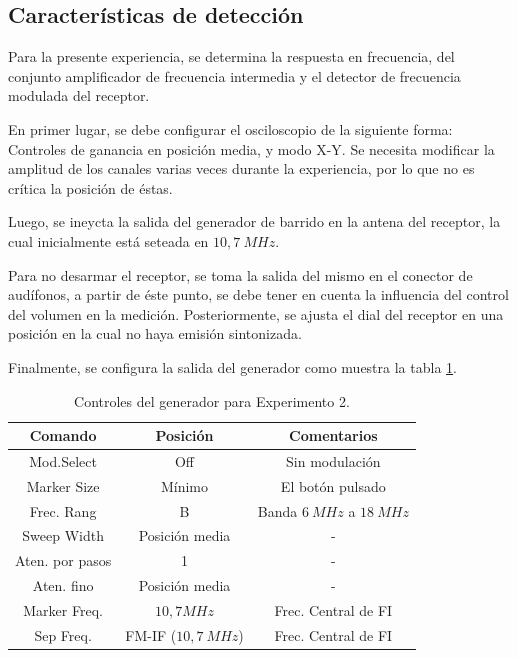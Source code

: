   \subsection{Características de detección}

  Para la presente experiencia, se determina la respuesta en frecuencia, del conjunto 
  amplificador de frecuencia intermedia y el detector de frecuencia modulada del 
  receptor.

  En primer lugar, se debe configurar el osciloscopio de la siguiente forma: 
  Controles de ganancia en posición media, y modo X-Y. Se necesita modificar 
  la amplitud de los canales varias veces durante la experiencia, por lo que 
  no es crítica la posición de éstas.

  Luego, se ineycta la salida del generador de barrido en la 
  antena del receptor, la cual inicialmente está seteada en $10,7~MHz$.

  Para no desarmar el receptor, se toma la salida del mismo en el conector 
  de audífonos, a partir de éste punto, se debe tener en cuenta la influencia 
  del control del volumen en la medición. Posteriormente, se ajusta el dial 
  del receptor en una posición en la cual no haya emisión sintonizada.

  Finalmente, se configura la salida del generador como muestra la tabla 
  \ref{tab:ControlesGenExp2}.

  \begin{table}[H] 
    \centering 
    \begin{tabular}[H]{|c|c|c|}
      \textbf{Comando} & \textbf{Posición} & \textbf{Comentarios} \\  \hline  
          Mod.Select    &       Off         &     Sin modulación  \\  \hline
          Marker Size   &       Mínimo      &   El botón pulsado  \\  \hline
          Frec. Rang    &      B            &  Banda $6~MHz$ a $18~MHz$ \\  \hline
          Sweep Width   &   Posición media  &       -             \\  \hline
          Aten. por pasos &       1         &       -             \\  \hline
          Aten. fino    &   Posición media  &       -             \\  \hline
          Marker Freq.  &   $10,7MHz$       & Frec. Central de  FI \\  \hline
          Sep Freq.     & FM-IF ($10,7~MHz$) & Frec. Central de  FI \\  \hline
    \end{tabular}
    \caption{Controles del generador para Experimento 2.}
    \label{tab:ControlesGenExp2}
  \end{table}

